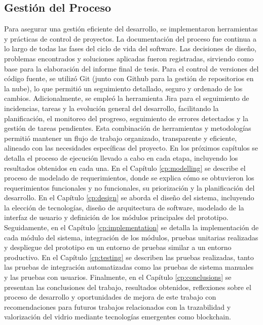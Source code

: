 \subsection{Gestión del Proceso}

Para asegurar una gestión eficiente del desarrollo, se implementaron herramientas y prácticas de control de proyectos.
La documentación del proceso fue continua a lo largo de todas las fases del ciclo de vida del software.
Las decisiones de diseño, problemas encontrados y soluciones aplicadas fueron registradas, sirviendo como base para la elaboración del informe final de tesis.
Para el control de versiones del código fuente, se utilizó Git (junto con Github para la gestión de repositorios en la nube), lo que permitió un seguimiento detallado, seguro y ordenado de los cambios.
Adicionalmente, se empleó la herramienta Jira para el seguimiento de incidencias, tareas y la evolución general del desarrollo, facilitando la planificación, el monitoreo del progreso, seguimiento de errores detectados y la gestión de tareas pendientes.
Esta combinación de herramientas y metodologías permitió mantener un flujo de trabajo organizado, transparente y eficiente, alineado con las necesidades específicas del proyecto.
En los próximos capítulos se detalla el proceso de ejecución llevado a cabo en cada etapa, incluyendo los resultados obtenidos en cada una.
En el Capítulo \ref{cp:modelling} se describe el proceso de modelado de requerimientos, donde se explica cómo se obtuvieron los requerimientos funcionales y no funcionales, su priorización y la planificación del desarrollo.
En el Capítulo \ref{cp:design} se aborda el diseño del sistema, incluyendo la elección de tecnologías, diseño de arquitectura de software, modelado de la interfaz de usuario y definición de los módulos principales del prototipo.
Seguidamente, en el Capítulo \ref{cp:implementation} se detalla la implementación de cada módulo del sistema, integración de los módulos, pruebas unitarias realizadas y despliegue del prototipo en un entorno de pruebas similar a un entorno productivo.
En el Capítulo \ref{cp:testing} se describen las pruebas realizadas, tanto las pruebas de integración automatizadas como las pruebas de sistema manuales y las pruebas con usuarios.
Finalmente, en el Capítulo \ref{cp:conclusions} se presentan las conclusiones del trabajo, resultados obtenidos, reflexiones sobre el proceso de desarrollo y oportunidades de mejora de este trabajo con recomendaciones para futuros trabajos relacionados con la trazabilidad y valorización del vidrio mediante tecnologías emergentes como blockchain.
